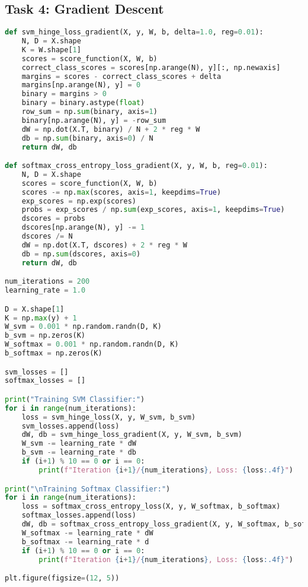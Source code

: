 \documentclass{article}
\begin{document}
\subsection{Task 4: Gradient Descent}
\begin{lstlisting}[language=Python]
def svm_hinge_loss_gradient(X, y, W, b, delta=1.0, reg=0.01):
    N, D = X.shape
    K = W.shape[1]
    scores = score_function(X, W, b)
    correct_class_scores = scores[np.arange(N), y][:, np.newaxis]
    margins = scores - correct_class_scores + delta
    margins[np.arange(N), y] = 0
    binary = margins > 0
    binary = binary.astype(float)
    row_sum = np.sum(binary, axis=1)
    binary[np.arange(N), y] = -row_sum
    dW = np.dot(X.T, binary) / N + 2 * reg * W
    db = np.sum(binary, axis=0) / N
    return dW, db

def softmax_cross_entropy_loss_gradient(X, y, W, b, reg=0.01):
    N, D = X.shape
    scores = score_function(X, W, b)
    scores -= np.max(scores, axis=1, keepdims=True) 
    exp_scores = np.exp(scores)
    probs = exp_scores / np.sum(exp_scores, axis=1, keepdims=True)
    dscores = probs
    dscores[np.arange(N), y] -= 1
    dscores /= N
    dW = np.dot(X.T, dscores) + 2 * reg * W
    db = np.sum(dscores, axis=0)
    return dW, db

num_iterations = 200
learning_rate = 1.0

D = X.shape[1]
K = np.max(y) + 1
W_svm = 0.001 * np.random.randn(D, K)
b_svm = np.zeros(K)
W_softmax = 0.001 * np.random.randn(D, K)
b_softmax = np.zeros(K)

svm_losses = []
softmax_losses = []

print("Training SVM Classifier:")
for i in range(num_iterations):
    loss = svm_hinge_loss(X, y, W_svm, b_svm)
    svm_losses.append(loss)
    dW, db = svm_hinge_loss_gradient(X, y, W_svm, b_svm)
    W_svm -= learning_rate * dW
    b_svm -= learning_rate * db
    if (i+1) % 10 == 0 or i == 0:
        print(f"Iteration {i+1}/{num_iterations}, Loss: {loss:.4f}")

print("\nTraining Softmax Classifier:")
for i in range(num_iterations):
    loss = softmax_cross_entropy_loss(X, y, W_softmax, b_softmax)
    softmax_losses.append(loss)
    dW, db = softmax_cross_entropy_loss_gradient(X, y, W_softmax, b_softmax)
    W_softmax -= learning_rate * dW
    b_softmax -= learning_rate * d
    if (i+1) % 10 == 0 or i == 0:
        print(f"Iteration {i+1}/{num_iterations}, Loss: {loss:.4f}")

plt.figure(figsize=(12, 5))


\end{lstlisting}
\end{document}
